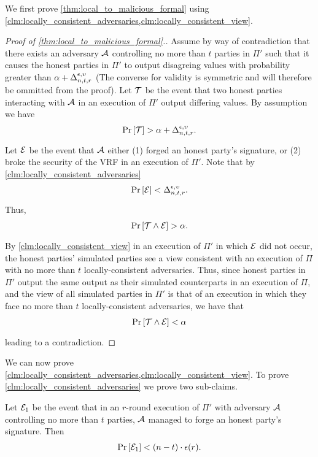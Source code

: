 We first prove \cref{thm:local_to_malicious_formal} using \cref{clm:locally_consistent_adversaries,clm:locally_consistent_view}.

\begin{proof}[Proof of \cref{thm:local_to_malicious_formal}.]
Assume by way of contradiction that there exists an adversary $\mathcal{A}$ controlling no more than $t$ parties in $\Pi'$ such that it causes the honest parties in $\Pi'$ to output disagreing values with probability greater than  $\alpha + \Delta^{\epsilon,\upsilon}_{n,t,r}$ (The converse for validity is symmetric and will therefore be ommitted from the proof).  Let $\mathcal{T}$ be the event that two honest parties interacting with $\mathcal{A}$ in an execution of $\Pi'$ output differing values. By assumption we have
\begin{align*}
 	\Pr_{}\left[\mathcal{T}\right] > \alpha + \Delta^{\epsilon,\upsilon}_{n,t,r}.
\end{align*}
Let $\mathcal{E}$ be the event that $\mathcal{A}$ either (1) forged an honest party's signature, or (2) broke the security of the VRF in an execution of $\Pi'$. Note that by \cref{clm:locally_consistent_adversaries}
\begin{align*}
	\Pr_{}\left[\mathcal{E}\right] < \Delta^{\epsilon,\upsilon}_{n,t,r}.
\end{align*}
Thus,
\begin{align*}
	\Pr_{}\left[\mathcal{T} \land \mathcal{E}\right] > \alpha.
\end{align*}
By \cref{clm:locally_consistent_view} in an execution of $\Pi'$ in which $\mathcal{E}$ did not occur, the honest parties' simulated parties see a view consistent with an execution of $\Pi$ with no more than $t$ locally-consistent adversaries. Thus, since honest parties in $\Pi'$ output the same output as their simulated counterparts in an execution of $\Pi$, and the view of all simulated parties in $\Pi'$ is that of an execution in which they face no more than $t$ locally-consistent adversaries, we have that
\begin{align*}
\Pr_{}\left[\mathcal{T} \land \mathcal{E}\right] < \alpha
\end{align*}
leading to a contradiction.
\end{proof}

We can now prove \cref{clm:locally_consistent_adversaries,clm:locally_consistent_view}. To prove \cref{clm:locally_consistent_adversaries} we prove two sub-claims.

\begin{claim}\label{clm:locally_consistent_eu}
	Let $\mathcal{E}_1$ be the event that in an $r$-round execution of $\Pi'$ with adversary $\mathcal{A}$ controlling no more than $t$ parties, $\mathcal{A}$ managed to forge an honest party's signature. Then
	\begin{align}\label{eq:locally_consistent_eu}
		\Pr_{}\left[\mathcal{E}_1\right] < (n-t)\cdot \epsilon(r).
	\end{align}
\end{claim}

